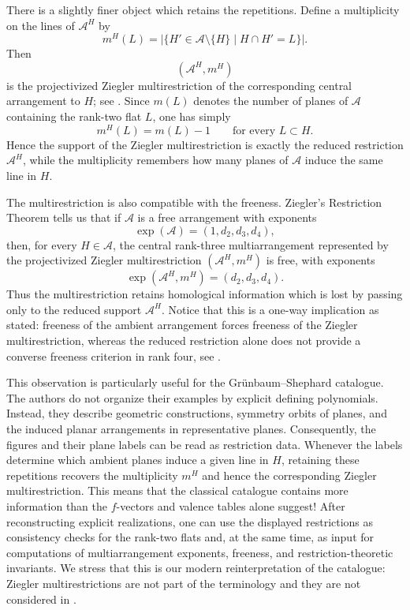 \documentclass[11pt]{article}
\theoremstyle{definition}
\theoremstyle{remark}
\newcommand{\cA}{\mathcal A}
\begin{document}
There is a slightly finer object which retains the repetitions. Define a
multiplicity on the lines of $\cA^H$ by
\[
m^H(L)
=
\bigl|\{H'\in\cA\setminus\{H\}\mid H\cap H'=L\}\bigr|.
\]
Then
\[
(\cA^H,m^H)
\]
is the projectivized Ziegler multirestriction of the corresponding central
arrangement to $H$; see \cite{Ziegler}. Since $m(L)$ denotes the number of
planes of $\cA$ containing the rank-two flat $L$, one has simply
\[
m^H(L)=m(L)-1
\qquad\text{for every }L\subset H.
\]
Hence the support of the Ziegler multirestriction is exactly the reduced
restriction $\cA^H$, while the multiplicity remembers how many planes
of $\cA$ induce the same line in $H$.

The multirestriction is also compatible with the freeness.  Ziegler's
Restriction Theorem \cite{Ziegler} tells us that if $\cA$ is a free arrangement with exponents
\[
 \exp(\cA)=(1,d_2,d_3,d_4),
\]
then, for every $H\in\cA$, the central rank-three multiarrangement represented
by the projectivized Ziegler multirestriction $(\cA^H,m^H)$ is free, with
exponents
\[
 \exp(\cA^H,m^H)=(d_2,d_3,d_4).
\]
Thus the multirestriction retains homological information which is lost by
passing only to the reduced support $\cA^H$.  Notice that this is a one-way
implication as stated: freeness of the ambient arrangement forces freeness
of the Ziegler multirestriction, whereas the reduced restriction alone does
not provide a converse freeness criterion in rank four, see \cite[Corollary 1.35]{Yoshinaga}.

This observation is particularly useful for the Gr\"unbaum--Shephard
catalogue. The authors do not organize their examples by explicit defining
polynomials. Instead, they describe geometric constructions, symmetry
orbits of planes, and the induced planar arrangements in representative
planes. Consequently, the figures and their
plane labels can be read as restriction data. Whenever the labels determine
which ambient planes induce a given line in $H$, retaining these repetitions
recovers the multiplicity $m^H$ and hence the corresponding Ziegler
multirestriction. This means that the classical catalogue contains more information than the
$f$-vectors and valence tables alone suggest! After reconstructing explicit
realizations, one can use the displayed restrictions as consistency checks
for the rank-two flats and, at the same time, as input for computations of
multiarrangement exponents, freeness, and restriction-theoretic invariants.
We stress that this is our modern reinterpretation of the catalogue: Ziegler
multirestrictions are not part of the terminology and they are not considered in 
\cite{GrunbaumShephard}.
\end{document}

